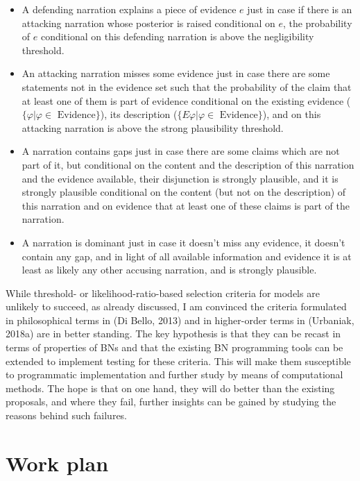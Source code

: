 \documentclass[11pt,dvipsnames,enabledeprecatedfontcommands]{scrartcl}
\begin{document}
\begin{itemize}\setlength\itemsep{-1mm}
 \item A defending narration explains  a piece of evidence  $e$ just in case  if there is an  attacking narration whose posterior is raised conditional on $e$, the probability of $e$ conditional on this defending narration is above the negligibility threshold.
 \item An attacking narration misses some evidence just in case there are some statements not in the evidence set such that the probability of the claim that at least one of them is part of evidence conditional on the existing evidence ($\{\varphi\vert \varphi \in \mbox{ Evidence}\}$), its description ($\{E\varphi\vert \varphi \in \mbox{ Evidence}\}$), and on this attacking narration is above the strong plausibility threshold. 
 \item A narration contains gaps just in case there are some claims which are not part of it, but conditional on the content and the description of this narration and the evidence available, their disjunction is strongly plausible, and it is strongly plausible conditional on the content (but not on the description) of this narration and on evidence that at least one of these claims is part of the narration.
 \item  A narration is dominant just in case it doesn't miss any evidence, it doesn’t contain any gap, and in light of all available information and evidence it is at least as likely any other accusing narration, and is strongly plausible.
 \end{itemize}

While threshold- or likelihood-ratio-based selection criteria for models
are unlikely to succeed, as already discussed, I am convinced the
criteria formulated in philosophical terms in (Di Bello, 2013) and in
higher-order terms in (Urbaniak, 2018a) are in better standing. The key
hypothesis is that they can be recast in terms of properties of BNs and
that the existing BN programming tools can be extended to implement
testing for these criteria. This will make them susceptible to
programmatic implementation and further study by means of computational
methods. The hope is that on one hand, they will do better than the
existing proposals, and where they fail, further insights can be gained
by studying the reasons behind such failures.

\hypertarget{work-plan}{%
\section{Work plan}\label{work-plan}}
\end{document}
